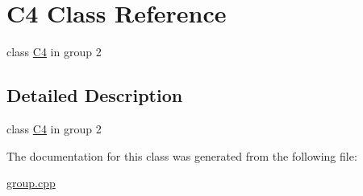 \hypertarget{classC4}{\section{C4 Class Reference}
\label{classC4}
}


class \hyperlink{classC4}{C4} in group 2  




\subsection{Detailed Description}
class \hyperlink{classC4}{C4} in group 2 

The documentation for this class was generated from the following file\-:\begin{DoxyCompactItemize}
\item 
\hyperlink{group_8cpp}{group.\-cpp}\end{DoxyCompactItemize}
